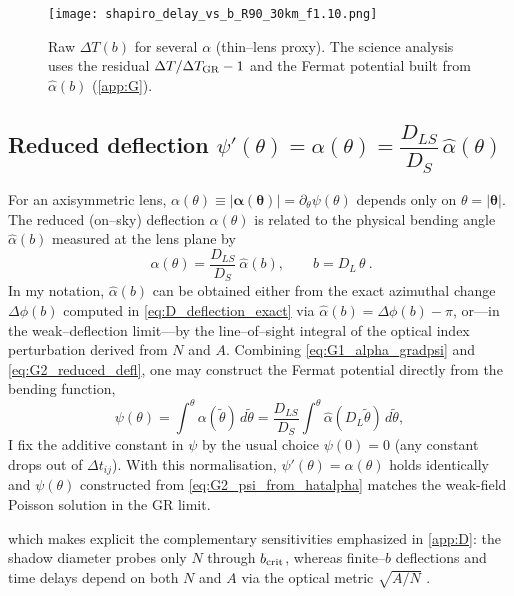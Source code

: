 \documentclass{iopjournal}
\begin{document}
\begin{figure}[t]
\centering
\texttt{[image: shapiro\_delay\_vs\_b\_R90\_30km\_f1.10.png]}
\caption{Raw \(\Delta T(b)\) for several \(\alpha\) (thin--lens proxy). The science analysis uses the residual \(\Delta T/\Delta T_{\rm GR}-1\) and the Fermat potential built from \(\hat\alpha(b)\) (\cref{app:G}).}
\end{figure}


\subsection{\texorpdfstring{Reduced deflection $\psi'(\theta)=\alpha(\theta)=\dfrac{D_{LS}}{D_S}\,\hat\alpha(\theta)$}{Reduced deflection: psi'(θ) = alpha(θ) = (DLS/DS) alpha-hat(θ)}}\label{app:G2}

For an axisymmetric lens, $\alpha(\theta)\equiv|\boldsymbol\alpha(\boldsymbol\theta)|=\partial_\theta\psi(\theta)$ depends only on $\theta=|\boldsymbol\theta|$. The reduced (on–sky) deflection $\alpha(\theta)$ is related to the physical bending angle $\hat\alpha(b)$ measured at the lens plane by
\begin{equation}
\boxed{\ \alpha(\theta)=\frac{D_{LS}}{D_{S}}\ \hat\alpha(b),\qquad b=D_L\,\theta\ } .
\label{eq:G2_reduced_defl}
\end{equation}
In my notation, $\hat\alpha(b)$ can be obtained either from the exact azimuthal change $\Delta\phi(b)$ computed in \eqref{eq:D_deflection_exact} via $\hat\alpha(b)=\Delta\phi(b)-\pi$, or—in the weak–deflection limit—by the line–of–sight integral of the optical index perturbation derived from $N$ and $A$. Combining \eqref{eq:G1_alpha_gradpsi} and \eqref{eq:G2_reduced_defl}, one may construct the Fermat potential directly from the bending function,
\begin{equation}
\psi(\theta)=\int^{\theta}\!\alpha(\tilde\theta)\,d\tilde\theta
=\frac{D_{LS}}{D_S}\int^{\theta}\!\hat\alpha(D_L\tilde\theta)\,d\tilde\theta,
\label{eq:G2_psi_from_hatalpha}
\end{equation}
I fix the additive constant in $\psi$ by the usual choice $\psi(0)=0$ (any constant drops out of $\Delta t_{ij}$). With this normalisation, $\psi'(\theta)=\alpha(\theta)$ holds identically and $\psi(\theta)$ constructed from \eqref{eq:G2_psi_from_hatalpha} matches the weak-field Poisson solution in the GR limit.

which makes explicit the complementary sensitivities emphasized in \cref{app:D}: the shadow diameter probes only $N$ through $b_{\rm crit}$, whereas finite–$b$ deflections and time delays depend on both $N$ and $A$ via the optical metric $\sqrt{A/N}$ \cite{Perlick2004LRR,BlandfordNarayan1986}.
\end{document}
